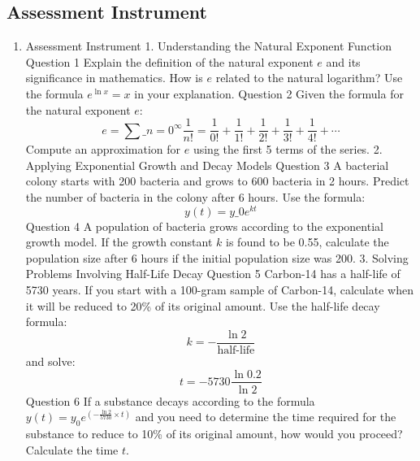 \subsection{Assessment Instrument}

\begin{enumerate}
    \item Assessment Instrument 1. Understanding the Natural Exponent Function Question 1 Explain the definition of the natural exponent $e$ and its significance in mathematics. How is $e$ related to the natural logarithm? Use the formula $e^{\ln x} = x$ in your explanation. Question 2 Given the formula for the natural exponent $e$: $$ e = \sum\_{n=0}^{\infty} \frac{1}{n!} = \frac{1}{0!} + \frac{1}{1!} + \frac{1}{2!} + \frac{1}{3!} + \frac{1}{4!} + \cdots $$ Compute an approximation for $e$ using the first 5 terms of the series. 2. Applying Exponential Growth and Decay Models Question 3 A bacterial colony starts with 200 bacteria and grows to 600 bacteria in 2 hours. Predict the number of bacteria in the colony after 6 hours. Use the formula: $$ y(t) = y\_0 e^{kt} $$ Question 4 A population of bacteria grows according to the exponential growth model. If the growth constant $k$ is found to be 0.55, calculate the population size after 6 hours if the initial population size was 200. 3. Solving Problems Involving Half-Life Decay Question 5 Carbon-14 has a half-life of 5730 years. If you start with a 100-gram sample of Carbon-14, calculate when it will be reduced to 20\% of its original amount. Use the half-life decay formula: $$ k = -\frac{\ln 2}{\text{half-life}} $$ and solve: $$ t = -5730 \frac{\ln 0.2}{\ln 2} $$ Question 6 If a substance decays according to the formula $y(t) = y_0 e^{\left(-\frac{\ln 2}{5730} \times t\right)}$ and you need to determine the time required for the substance to reduce to 10\% of its original amount, how would you proceed? Calculate the time $t$.
\end{enumerate}
